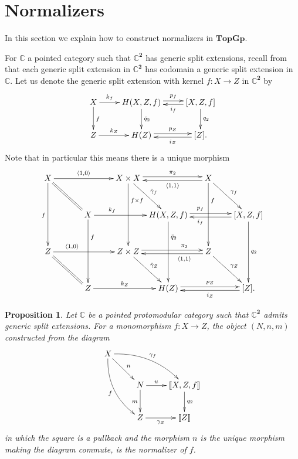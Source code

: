 \documentclass{article}
\newcommand{\C}{\mathbb{C}}
\newcommand{\TopGp}{\mathbf{TopGp}}
\newcommand{\spexc}[1]{\llbracket#1\rrbracket}
\newcommand{\two}{\mathbf{2}}
\newtheorem{proposition}[theorem]{Proposition}
\begin{document}
\section{Normalizers}
In this section we explain how to construct normalizers in $\TopGp$.

For $\C$ a pointed category such that $\C^{\two}$ has generic split extensions,
recall from
\cite{GRAY:2017} that each generic split
extension in
$\mathbb{C}^\two$ has codomain a generic split extension in $\C$.
Let us denote the generic split extension with kernel $f:X\to Z$
in $\mathbb{C}^\two$ by
\begin{equation}\label{generic_split_ext_in_mor_cat}
\vcenter{
\xymatrix{
X\ar[d]^{f} \ar[r]^-{k_f} & 
H(X,Z,f)\ar@<0.5ex>[r]^-{p_f}\ar[d]^{\bar q_2} & 
[X,Z,f]\ar@<0.5ex>[l]^-{i_f}\ar[d]^{q_2}\\
Z \ar[r]^-{k_Z} & H(Z)\ar@<0.5ex>[r]^-{p_Z} & [Z].\ar@<0.5ex>[l]^-{i_Z}
}
}
\end{equation}
Note that in particular this means there is a unique morphism
\[
\xymatrix@!@C=-1ex@R=-2ex{
X
\ar[rr]^-{\langle 1,0\rangle}
\ar[dd]_{f}
\ar@{=}[rd]
&
&
X\times X
\ar@<0.5ex>[rr]^-{\pi_2}
\ar[dd]^(0.3){f\times f}
\ar[rd]^{\bar \gamma_f}
&
&
X
\ar@<0.5ex>[ll]^-{\langle 1,1 \rangle}
\ar[dd]^(0.3){f}
\ar[rd]^{\gamma_f}
\\
&
X
\ar[dd]^(0.3){f}
\ar[rr]^(0.3){k_f}
&
&
H(X,Z,f)
\ar@<0.5ex>[rr]^(0.4){p_f}
\ar[dd]^(0.3){\bar q_2}
&
&
[X,Z,f]
\ar@<0.5ex>[ll]^(0.6){i_f}
\ar[dd]^{q_2}
\\
Z
\ar[rr]^(0.3){\langle 1,0\rangle}
\ar@{=}[rd]
&
&
Z\times Z
\ar@<0.5ex>[rr]^(0.7){\pi_2}
\ar[rd]^{\bar \gamma_Z}
&
&
Z
\ar@<0.5ex>[ll]^(0.3){\langle 1,1 \rangle}
\ar[rd]^{\gamma_Z}
\\
&
Z
\ar[rr]^-{k_Z}
&
&
H(Z)
\ar@<0.5ex>[rr]^-{p_Z}
&
&
[Z].
\ar@<0.5ex>[ll]^-{i_Z}
}
\]
\begin{proposition}\label{proposition:abstract_normalizer}
Let $\C$ be a pointed protomodular category such that $\C^{\two}$ admits generic split extensions. For a monomorphism $f:X\to Z$,
the object $(N,n,m)$ constructed from the diagram
\[
\xymatrix{
X
\ar@/^3ex/[rrd]^{\gamma_f}
\ar@/_3ex/[rdd]_{f}
\ar[rd]^{n}
\\
&
N
\ar[d]_{m}
\ar[r]^-{u}
&
\spexc{X,Z,f}
\ar[d]^{q_2}
\\
&
Z
\ar[r]_-{\gamma_Z}
&
\spexc{Z}
}
\]
in which the square is a pullback and the morphism $n$ is the unique morphism making the diagram commute,
is the normalizer of $f$.
\end{proposition}
\end{document}
